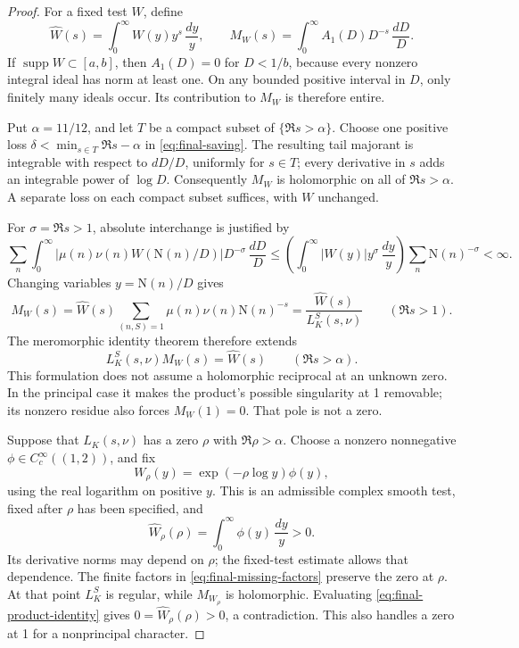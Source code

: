 \documentclass[11pt]{article}
\numberwithin{equation}{section}
\theoremstyle{definition}
\theoremstyle{remark}
\newcommand{\N}{\mathrm N}
\begin{document}
\begin{proof}
For a fixed test \(W\), define
\[
 \widehat W(s)=\int_0^\infty W(y)y^s\,\frac{dy}{y},
 \qquad
 M_W(s)=\int_0^\infty A_1(D)D^{-s}\,\frac{dD}{D}.
\]
If \(\operatorname{supp}W\subset[a,b]\), then \(A_1(D)=0\)
for \(D<1/b\), because every nonzero integral ideal has norm at
least one. On any bounded positive interval in \(D\), only finitely
many ideals occur. Its contribution to \(M_W\) is therefore entire.

Put \(\alpha=11/12\), and let \(T\) be a compact subset of
\(\{\Re s>\alpha\}\). Choose one positive loss
\(\delta<\min_{s\in T}\Re s-\alpha\) in
\eqref{eq:final-saving}. The resulting tail majorant is integrable
with respect to \(dD/D\), uniformly for \(s\in T\); every derivative
in \(s\) adds an integrable power of \(\log D\). Consequently
\(M_W\) is holomorphic on all of \(\Re s>\alpha\). A separate loss
on each compact subset suffices, with \(W\) unchanged.

For \(\sigma=\Re s>1\), absolute interchange is justified by
\[
 \sum_n\int_0^\infty
   |\mu(n)\nu(n)W(\N(n)/D)|D^{-\sigma}\,\frac{dD}{D}
 \le
 \left(\int_0^\infty|W(y)|y^\sigma\,\frac{dy}{y}\right)
 \sum_n\N(n)^{-\sigma}<\infty.
\]
Changing variables \(y=\N(n)/D\) gives
\begin{equation}\label{eq:final-mellin-identity}
 M_W(s)=\widehat W(s)
      \sum_{(n,S)=1}\mu(n)\nu(n)\N(n)^{-s}
      =\frac{\widehat W(s)}{L_K^S(s,\nu)}
      \qquad(\Re s>1).
\end{equation}
The meromorphic identity theorem therefore extends
\begin{equation}\label{eq:final-product-identity}
 L_K^S(s,\nu)M_W(s)=\widehat W(s)
       \qquad(\Re s>\alpha).
\end{equation}
This formulation does not assume a holomorphic reciprocal at an
unknown zero. In the principal case it makes the product's possible
singularity at 1 removable; its nonzero residue also forces
\(M_W(1)=0\). That pole is not a zero.

Suppose that \(L_K(s,\nu)\) has a zero \(\rho\) with
\(\Re\rho>\alpha\). Choose a nonzero nonnegative
\(\phi\in C_c^\infty((1,2))\), and fix
\[
 W_\rho(y)=\exp(-\rho\log y)\phi(y),
\]
using the real logarithm on positive \(y\). This is an admissible
complex smooth test, fixed after \(\rho\) has been specified, and
\[
 \widehat W_\rho(\rho)=\int_0^\infty\phi(y)\,\frac{dy}{y}>0.
\]
Its derivative norms may depend on \(\rho\); the fixed-test estimate
allows that dependence. The finite factors in
\eqref{eq:final-missing-factors} preserve the zero at \(\rho\).
At that point \(L_K^S\) is regular, while \(M_{W_\rho}\) is
holomorphic. Evaluating \eqref{eq:final-product-identity} gives
\(0=\widehat W_\rho(\rho)>0\), a contradiction. This also handles
a zero at 1 for a nonprincipal character.
\end{proof}
\end{document}
